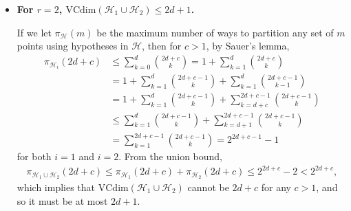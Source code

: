 \documentclass[a4paper,12pt]{article}
\theoremstyle{remark}
\begin{document}
\begin{itemize}
        \item
            \boldmath\textbf{For $r = 2$, $\mathrm{VCdim}(\mathcal{H}_1 \cup \mathcal{H}_2) \leq 2d + 1$.
            }\unboldmath \par
            If we let $\pi_{\mathcal{H}}(m)$ be the maximum number of ways to partition any set of $m$ points using hypotheses in $\mathcal{H}$, then for $c > 1$, by Sauer's lemma,
            \begin{align*}
                \pi_{\mathcal{H}_i}(2d + c) &\leq \sum_{k = 0}^d \binom{2d + c}{k}
                = 1 + \sum_{k = 1}^d \binom{2d + c}{k} \\
                &= 1 + \sum_{k = 1}^d \binom{2d + c - 1}{k} + \sum_{k = 1}^d \binom{2d + c - 1}{k - 1} \\
                &= 1 + \sum_{k = 1}^d \binom{2d + c - 1}{k} + \sum_{k = d + c}^{2d + c - 1} \binom{2d + c - 1}{k} \\
                &\leq \sum_{k = 1}^d \binom{2d + c - 1}{k} + \sum_{k = d + 1}^{2d + c - 1} \binom{2d + c - 1}{k} \\
                &= \sum_{k = 1}^{2d + c - 1} \binom{2d + c - 1}{k} = 2^{2d + c - 1} - 1
            \end{align*}
            for both $i = 1$ and $i = 2$. From the union bound,
            \begin{align*}
                \pi_{\mathcal{H}_1 \cup \mathcal{H}_2}(2d + c) \leq \pi_{\mathcal{H}_1}(2d + c) + \pi_{\mathcal{H}_2}(2d + c) \leq 2^{2d + c} - 2 < 2^{2d + c},
            \end{align*}
            which implies that $\mathrm{VCdim}(\mathcal{H}_1 \cup \mathcal{H}_2)$ cannot be $2d + c$ for any $c > 1$, and so it must be at most $2d + 1$.
    \end{itemize}
\end{document}

